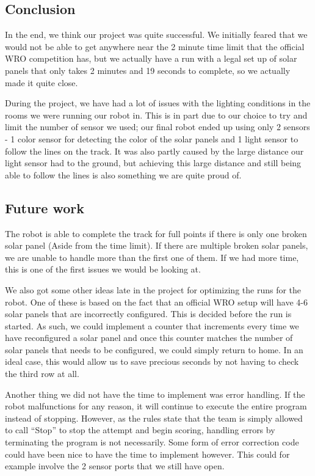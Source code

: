 \subsection{Conclusion}

In the end, we think our project was quite successful. We initially
feared that we would not be able to get anywhere near the 2 minute time
limit that the official WRO competition has, but we actually have a run
with a legal set up of solar panels that only takes 2 minutes and 19
seconds to complete, so we actually made it quite close.

During the project, we have had a lot of issues with the lighting
conditions in the rooms we were running our robot in. This is in part
due to our choice to try and limit the number of sensor we used; our
final robot ended up using only 2 sensors - 1 color sensor for detecting
the color of the solar panels and 1 light sensor to follow the lines on
the track. It was also partly caused by the large distance our light
sensor had to the ground, but achieving this large distance and still
being able to follow the lines is also something we are quite proud of.

\subsection{Future work}

The robot is able to complete the track for full points if there is only
one broken solar panel (Aside from the time limit). If there are
multiple broken solar panels, we are unable to handle more than the
first one of them. If we had more time, this is one of the first issues
we would be looking at.

We also got some other ideas late in the project for optimizing the runs
for the robot. One of these is based on the fact that an official WRO
setup will have 4-6 solar panels that are incorrectly configured. This
is decided before the run is started. As such, we could implement a
counter that increments every time we have reconfigured a solar panel
and once this counter matches the number of solar panels that needs to
be configured, we could simply return to home. In an ideal case, this
would allow us to save precious seconds by not having to check the third
row at all.

Another thing we did not have the time to implement was error handling.
If the robot malfunctions for any reason, it will continue to execute
the entire program instead of stopping. However, as the rules state that
the team is simply allowed to call ``Stop'' to stop the attempt and
begin scoring, handling errors by terminating the program is not
necessarily. Some form of error correction code could have been nice to
have the time to implement however. This could for example involve the 2
sensor ports that we still have open.
